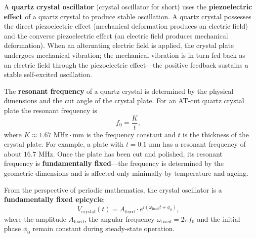 \begin{definition}\label{def:quartz_oscillator}
A \textbf{quartz crystal oscillator} (crystal oscillator for short) uses the \textbf{piezoelectric effect} of a quartz crystal to produce stable oscillation. A quartz crystal possesses the direct piezoelectric effect (mechanical deformation produces an electric field) and the converse piezoelectric effect (an electric field produces mechanical deformation). When an alternating electric field is applied, the crystal plate undergoes mechanical vibration; the mechanical vibration is in turn fed back as an electric field through the piezoelectric effect---the positive feedback sustains a stable self-excited oscillation.

The \textbf{resonant frequency} of a quartz crystal is determined by the physical dimensions and the cut angle of the crystal plate. For an AT-cut quartz crystal plate the resonant frequency is
\[
f_0 = \frac{K}{t},
\]
where $K \approx 1.67 \text{ MHz}\cdot\text{mm}$ is the frequency constant and $t$ is the thickness of the crystal plate. For example, a plate with $t = 0.1$ mm has a resonant frequency of about $16.7$ MHz. Once the plate has been cut and polished, its resonant frequency is \textbf{fundamentally fixed}---the frequency is determined by the geometric dimensions and is affected only minimally by temperature and ageing.

From the perspective of periodic mathematics, the crystal oscillator is a \textbf{fundamentally fixed epicycle}:
\[
V_{\text{crystal}}(t) = A_{\text{fixed}} \cdot e^{i(\omega_{\text{fixed}} t + \phi_0)},
\]
where the amplitude $A_{\text{fixed}}$, the angular frequency $\omega_{\text{fixed}} = 2\pi f_0$ and the initial phase $\phi_0$ remain constant during steady-state operation.
\end{definition}

